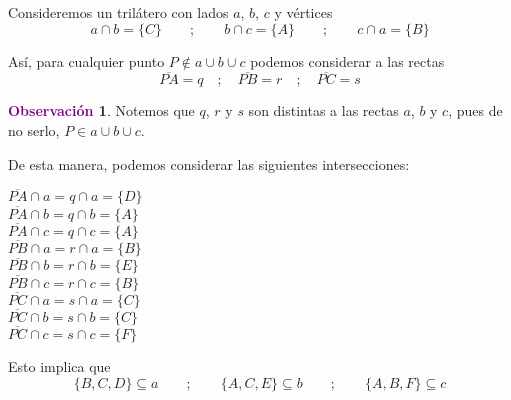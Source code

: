\documentclass[12pt]{book}
\theoremstyle{definition}
\newtheorem{obs}[teo]{\textcolor{purple}{Observación}}
\begin{document}
Consideremos un trilátero con lados $a$, $b$, $c$ y vértices
$$a \cap b =\{C\} \qquad ; \qquad b \cap c = \{A\} \qquad ; \qquad c \cap a = \{B\}$$

Así, para cualquier punto $P \notin a \cup b \cup c$ podemos considerar a las rectas
$$\overline{PA} = q \quad ; \quad \overline{PB} = r\quad ; \quad \overline{PC} = s$$

\begin{obs}
Notemos que $q$, $r$ y $s$ son distintas a las rectas $a$, $b$ y $c$, pues de no serlo, $P \in a \cup b \cup c$.
\end{obs}

De esta manera, podemos considerar las siguientes intersecciones:
\begin{center}
\begin{multicols}{3}
$\overline{PA} \cap a = q \cap a = \{D\}$\\
$\overline{PA} \cap b = q \cap b = \{A\}$\\
$\overline{PA} \cap c = q \cap c = \{A\}$\\
$\overline{PB} \cap a = r \cap a = \{B\}$\\
$\overline{PB} \cap b = r \cap b = \{E\}$\\
$\overline{PB} \cap c = r \cap c = \{B\}$\\
$\overline{PC} \cap a = s \cap a = \{C\}$\\
$\overline{PC} \cap b = s \cap b = \{C\}$\\
$\overline{PC} \cap c = s \cap c = \{F\}$
\end{multicols}
\end{center}

Esto implica que
$$ \{B,C,D\}\subseteq a \qquad ; \qquad \{A,C,E\} \subseteq b \qquad ; \qquad \{A,B,F\} \subseteq c$$
\end{document}
